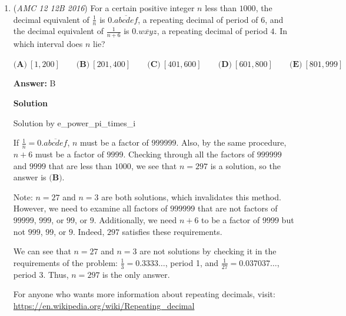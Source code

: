\begin{enumerate}
 This recursive process confirms the telescoping series:

 
 \[\sum_{k=1}^{\infty} \frac{1}{2(k+1)(k+2)} = \frac{1}{2} \left( \left( \frac{1}{2} - \frac{1}{3} \right) + \left( \frac{1}{3} - \frac{1}{4} \right) + \left( \frac{1}{4} - \frac{1}{5} \right) + \cdots \right)\]

 Most terms cancel, and we are left with: $\frac{1}{2} \cdot \frac{1}{2} =  \boxed{\textbf{(B) }\frac{1}{4}}$.

 


	\item (\textit{AMC 12 12B 2016}) For a certain positive integer $n$ less than $1000$, the decimal equivalent of $\frac{1}{n}$ is $0.\overline{abcdef}$, a repeating decimal of period of $6$, and the decimal equivalent of $\frac{1}{n+6}$ is $0.\overline{wxyz}$, a repeating decimal of period $4$. In which interval does $n$ lie?


 $\textbf{(A)}\ [1,200]\qquad\textbf{(B)}\ [201,400]\qquad\textbf{(C)}\ [401,600]\qquad\textbf{(D)}\ [601,800]\qquad\textbf{(E)}\ [801,999]$

 \textbf{Answer: }B



\textbf{Solution}

Solution by e\_power\_pi\_times\_i

 If $\frac{1}{n} = 0.\overline{abcdef}$, $n$ must be a factor of $999999$. Also, by the same procedure, $n+6$ must be a factor of $9999$. Checking through all the factors of $999999$ and $9999$ that are less than $1000$, we see that $n = 297$ is a solution, so the answer is $\boxed{\textbf{(B)}}$.

 Note: $n = 27$ and $n = 3$ are both solutions, which invalidates this method. However, we need to examine all factors of $999999$ that are not factors of $99999$, $999$, or $99$, or $9$. Additionally, we need $n+6$ to be a factor of $9999$ but not $999$, $99$, or $9$. Indeed, $297$ satisfies these requirements.

 We can see that $n=27$ and $n=3$ are not solutions by checking it in the requirements of the problem: $\frac{1}{3}=0.3333\dots$, period 1, and $\frac{1}{27}=0.037037\dots$, period 3. Thus, $n=297$ is the only answer.

 For anyone who wants more information about repeating decimals, visit: \href{https://en.wikipedia.org/wiki/Repeating\_decimal}{https://en.wikipedia.org/wiki/Repeating\_decimal}

 




\end{enumerate}
